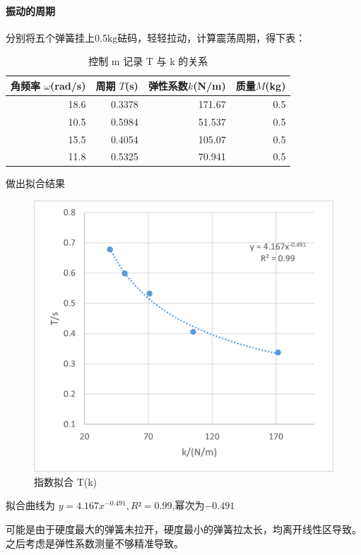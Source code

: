 \documentclass[a4paper,zihao=5,UTF8,fontset=fandol]{../phyreport}
\begin{document}
\paragraph{振动的周期}  
分别将五个弹簧挂上0.5kg砝码，轻轻拉动，计算震荡周期，得下表：
\begin{table}[H]
	\centering
	\caption{控制 m 记录 T 与 k 的关系}
	  \begin{tabular}{rrrr}
		\toprule
		角频率 $\omega$(rad/s) & 周期 $T$(s) & 弹性系数$k$(N/m) & 质量$M$(kg) \\
		\midrule
	  18.6  & 0.3378  & 171.67 & 0.5 \\
	  10.5  & 0.5984  & 51.537 & 0.5 \\
	  15.5  & 0.4054  & 105.07 & 0.5 \\
	  11.8  & 0.5325  & 70.941 & 0.5 \\
	  \bottomrule
	  \end{tabular}
	\label{tab:allk}
\end{table}
  
做出拟合结果
\begin{figure}[H]
	\centering
	\includegraphics{./fig/实验2拟合.png}
	\caption{指数拟合 T(k)}
	\label{fig:}
\end{figure}

拟合曲线为 $y = 4.167 x^{-0.491},R² = 0.99$,幂次为$-0.491$

可能是由于硬度最大的弹簧未拉开，硬度最小的弹簧拉太长，均离开线性区导致。之后考虑是弹性系数测量不够精准导致。
\end{document}
